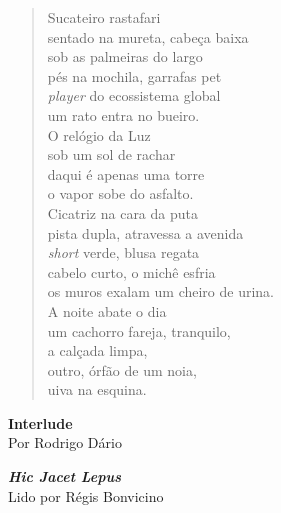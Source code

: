 \begin{verse}
Sucateiro rastafari\\
sentado na mureta, cabeça baixa\\
sob as palmeiras do largo\\
pés na mochila, garrafas pet\\[5pt]
\emph{player} do ecossistema global\\
um rato entra no bueiro.\\
O relógio da Luz\\
sob um sol de rachar\\[5pt]
daqui é apenas uma torre\\
o vapor sobe do asfalto.\\
Cicatriz na cara da puta\\
pista dupla, atravessa a avenida\\[5pt]
\emph{short} verde, blusa regata\\
cabelo curto, o michê esfria\\
os muros exalam um cheiro de urina.\\
A noite abate o dia\\[5pt]
um cachorro fareja, tranquilo,\\
a calçada limpa,\\
outro, órfão de um noia,\\
uiva na esquina.
\end{verse}

\pagebreak

\textbf{Interlude}\\
Por Rodrigo Dário

\pagebreak

\textbf{\emph{Hic Jacet Lepus}}\\
Lido por Régis Bonvicino


